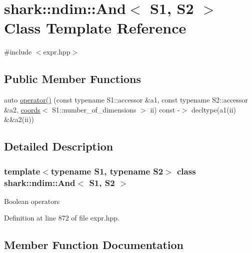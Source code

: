\hypertarget{classshark_1_1ndim_1_1_and}{}\section{shark\+:\+:ndim\+:\+:And$<$ S1, S2 $>$ Class Template Reference}
\label{classshark_1_1ndim_1_1_and}


{\ttfamily \#include $<$expr.\+hpp$>$}

\subsection*{Public Member Functions}
\begin{DoxyCompactItemize}
\item 
auto \hyperlink{classshark_1_1ndim_1_1_and_a83eedc380e1f8cff9efeac61b2eec4ea}{operator()} (const typename S1\+::accessor \&a1, const typename S2\+::accessor \&a2, \hyperlink{structshark_1_1ndim_1_1coords}{coords}$<$ S1\+::number\+\_\+of\+\_\+dimensions $>$ ii) const -\/$>$ decltype(a1(ii) \&\&a2(ii))
\end{DoxyCompactItemize}


\subsection{Detailed Description}
\subsubsection*{template$<$typename S1, typename S2$>$\newline
class shark\+::ndim\+::\+And$<$ S1, S2 $>$}

Boolean operators 

Definition at line 872 of file expr.\+hpp.



\subsection{Member Function Documentation}
\hypertarget{classshark_1_1ndim_1_1_and_a83eedc380e1f8cff9efeac61b2eec4ea}{}\label{classshark_1_1ndim_1_1_and_a83eedc380e1f8cff9efeac61b2eec4ea} 
